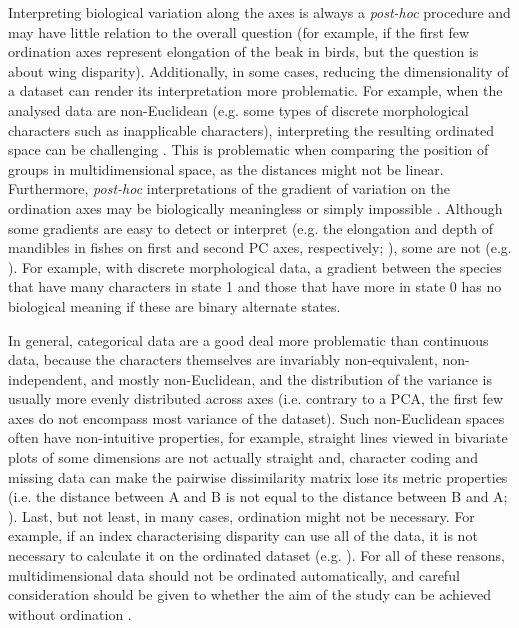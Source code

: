 \documentclass[12pt,letterpaper]{article}
\begin{document}
Interpreting biological variation along the axes is always a \textit{post-hoc} procedure and may have little relation to the overall question (for example, if the first few ordination axes represent elongation of the beak in birds, but the question is about wing disparity).
Additionally, in some cases, reducing the dimensionality of a dataset can render its interpretation more problematic.
For example, when the analysed data are non-Euclidean (e.g. some types of discrete morphological characters such as inapplicable characters), interpreting the resulting ordinated space can be challenging \citep{Gerber2019}.
This is problematic when comparing the position of groups in multidimensional space, as the distances might not be linear.
Furthermore, \textit{post-hoc} interpretations of the gradient of variation on the ordination axes may be biologically meaningless or simply impossible \citep{Gerber2019}.
Although some gradients are easy to detect or interpret (e.g.
the elongation and depth of mandibles in fishes on first and second PC axes, respectively; \citealt{Hill2018}), some are not (e.g. \citealt{Weisbecker2019}).
For example, with discrete morphological data, a gradient between the species that have many characters in state 1 and those that have more in state 0 has no biological meaning if these are binary alternate states.

In general, categorical data are a good deal more problematic than continuous data, because the characters themselves are invariably non-equivalent, non-independent, and mostly non-Euclidean, and the distribution of the variance is usually more evenly distributed across axes (i.e. contrary to a PCA, the first few axes do not encompass most variance of the dataset).
Such non-Euclidean spaces often have non-intuitive properties, for example, straight lines viewed in bivariate plots of some dimensions are not actually straight and, character coding and missing data can make the pairwise dissimilarity matrix lose its metric properties (i.e. the distance between A and B is not equal to the distance between B and A; \citealt{Gerber2014}).
Last, but not least, in many cases, ordination might not be necessary.
For example, if an index characterising disparity can use all of the data, it is not necessary to calculate it on the ordinated dataset (e.g. \citealt{Close2015}).
For all of these reasons, multidimensional data should not be ordinated automatically, and careful consideration should be given to whether the aim of the study can be achieved without ordination \citep{lloyd2016,lloyd2018}.
\end{document}
